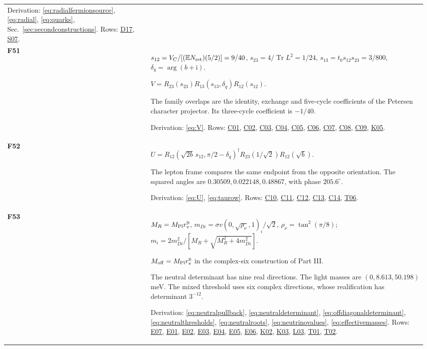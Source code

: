 \documentclass[aps,prx,onecolumn,10pt,notitlepage,nofootinbib,longbibliography]{revtex4-2}
\numberwithin{equation}{section}
\numberwithin{table}{section}
\newcommand{\EE}{\mathbb E}
\newcommand{\Tr}{\operatorname{Tr}}
\newcommand{\ii}{\mathrm i}
\begin{document}
\begin{longtable}{@{}>{\raggedright\arraybackslash}p{}>{\raggedright\arraybackslash}p{}@{}}
Derivation: \eqref{eq:radialfermionsource}, \eqref{eq:radial}, \eqref{eq:quarks}, Sec.~\ref{sec:secondconstructions}. Rows: \hyperlink{row-D17}{D17}, \hyperlink{row-S07}{S07}.\\[7pt]
\hypertarget{formula-F51}{}\textbf{F51}\label{formula:F51} & $s_{12}=V_C/[(\EE N_{\rm ret})(5/2)]=9/40$, $s_{23}=4/\Tr L^2=1/24$, $s_{13}=t_0s_{12}s_{23}=3/800$, $\delta_q=\arg(b+\ii)$.\par $V=R_{23}(s_{23})R_{13}(s_{13},\delta_q)R_{12}(s_{12})$.\par
The family overlaps are the identity, exchange and five-cycle coefficients of the Petersen character projector. Its three-cycle coefficient is $-1/40$.\par
Derivation: \eqref{eq:V}. Rows: \hyperlink{row-C01}{C01}, \hyperlink{row-C02}{C02}, \hyperlink{row-C03}{C03}, \hyperlink{row-C04}{C04}, \hyperlink{row-C05}{C05}, \hyperlink{row-C06}{C06}, \hyperlink{row-C07}{C07}, \hyperlink{row-C08}{C08}, \hyperlink{row-C09}{C09}, \hyperlink{row-K05}{K05}.\\[7pt]
\hypertarget{formula-F52}{}\textbf{F52}\label{formula:F52} & $U=R_{12}(\sqrt{2b}\,s_{12},\pi/2-\delta_q)^\dagger R_{23}(1/\sqrt2)R_{12}(\sqrt b)$.\par
The lepton frame compares the same endpoint from the opposite orientation. The squared angles are $0.30509,0.022148,0.48867$, with phase $205.6^\circ$.\par
Derivation: \eqref{eq:U}, \eqref{eq:taurow}. Rows: \hyperlink{row-C10}{C10}, \hyperlink{row-C11}{C11}, \hyperlink{row-C12}{C12}, \hyperlink{row-C13}{C13}, \hyperlink{row-C14}{C14}, \hyperlink{row-T06}{T06}.\\[7pt]
\hypertarget{formula-F53}{}\textbf{F53}\label{formula:F53} & $M_R=M_{\rm Pl}r_{\rm v}^9$, $m_{Di}=\sigma v(0,\sqrt{\rho_\nu},1)_i/\sqrt2$, $\rho_\nu=\tan^2(\pi/8)$; $m_i=2m_{Di}^2/[M_R+\sqrt{M_R^2+4m_{Di}^2}]$.\par $M_{\rm off}=M_{\rm Pl}r_{\rm v}^6$ in the complex-six construction of Part III.\par
The neutral determinant has nine real directions. The light masses are $(0,8.613,50.198)$ meV. The mixed threshold uses six complex directions, whose realification has determinant $3^{-12}$.\par
Derivation: \eqref{eq:neutralpullback}, \eqref{eq:neutraldeterminant}, \eqref{eq:offdiagonaldeterminant}, \eqref{eq:neutralthresholds}, \eqref{eq:neutralroots}, \eqref{eq:neutrinovalues}, \eqref{eq:effectivemasses}. Rows: \hyperlink{row-E07}{E07}, \hyperlink{row-E01}{E01}, \hyperlink{row-E02}{E02}, \hyperlink{row-E03}{E03}, \hyperlink{row-E04}{E04}, \hyperlink{row-E05}{E05}, \hyperlink{row-E06}{E06}, \hyperlink{row-K02}{K02}, \hyperlink{row-K03}{K03}, \hyperlink{row-L03}{L03}, \hyperlink{row-T01}{T01}, \hyperlink{row-T02}{T02}.\\[7pt]

\end{longtable}
\end{document}
